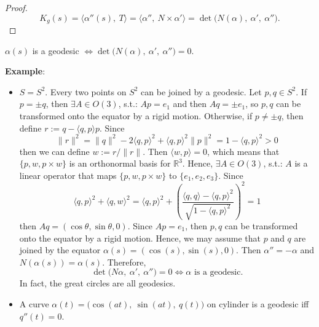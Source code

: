 \begin{proof}
\[
K_g(s) = \big\langle\alpha''(s),\ T\big\rangle = \big\langle\alpha'',\ N\times\alpha'\big\rangle = \det\big(N(\alpha),\ \alpha',\ \alpha''\big).
\]
\end{proof}

\begin{corollary}
$\alpha(s)$ is a geodesic $\iff \det\big(N(\alpha),\ \alpha',\ \alpha''\big) = 0$.
\end{corollary}

\noindent\textbf{Example}:
\begin{itemize}
\item $S = S^2$. Every two points on $S^2$ can be joined by a geodesic. Let $p, q\in S^2$. If $p = \pm q$, then $\exists A\in O(3)$, s.t.: $Ap = e_1$ and then $Aq = \pm e_1$, so $p, q$ can be transformed onto the equator by a rigid motion. Otherwise, if $p\neq\pm q$, then define $r := q - \langle q, p\rangle p$. Since
\[
\|r\|^2 = \|q\|^2 - 2\langle q, p\rangle^2 + \langle q, p\rangle^2\|p\|^2 = 1 - \langle q, p\rangle^2 > 0
\]
then we can define $w := r/\|r\|$. Then $\langle w, p\rangle = 0$, which means that $\{p, w, p\times w\}$ is an orthonormal basis for $\mathbb{R}^3$. Hence, $\exists A\in O(3)$, s.t.: $A$ is a linear operator that maps $\{p, w, p\times w\}$ to $\{e_1, e_2, e_3\}$. Since
\[
\langle q, p\rangle^2 + \langle q, w\rangle^2 = \langle q, p\rangle^2 + \left(\frac{\langle q, q\rangle - \langle q, p\rangle^2}{\sqrt{1 - \langle q, p\rangle^2}}\right)^2 = 1
\]
then $Aq = (\cos\theta, \sin\theta, 0)$. Since $Ap = e_1$, then $p, q$ can be transformed onto the equator by a rigid motion. Hence, we may assume that $p$ and $q$ are joined by the equator $\alpha(s) = (\cos(s), \sin(s), 0)$. Then $\alpha'' = -\alpha$ and $N(\alpha(s)) = \alpha(s)$. Therefore,
\[
\det\big(N\alpha,\ \alpha',\ \alpha''\big) = 0 \iff \alpha\text{ is a geodesic.}
\]
In fact, the great circles are all geodesics.
\item A curve $\alpha(t) = \big(\cos(at),\ \sin(at),\ q(t)\big)$ on cylinder is a geodesic iff $q''(t) = 0$.


\end{itemize}
